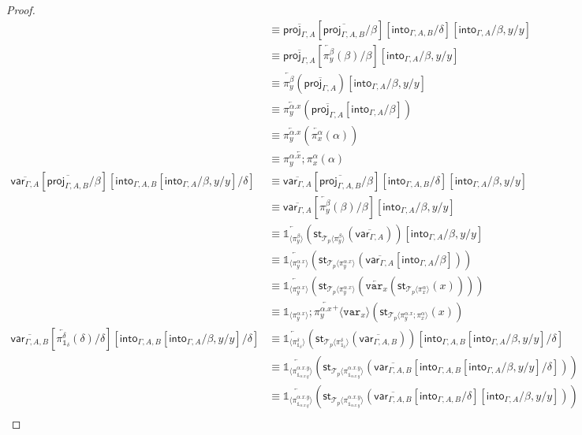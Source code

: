 \documentclass[10pt]{article}
\theoremstyle{definition}
\newcommand{\rewrite}[2]{\overleftarrow{#1}(#2)}
\newcommand\StI[2]{\ensuremath{\mathsf{st}_{#1}(#2)}}
\newcommand\ApEl[2]{\mathcal{T}_{#1}\langle#2\rangle}
\newcommand\ApPlus[2]{\ensuremath{{#1}^+ \langle #2 \rangle }}
\newcommand{\upstairs}[1]{\overline{#1}}
\newcommand\proj[1]{\ensuremath{\mathsf{proj}_{#1}}}
\newcommand\qvar[1]{\ensuremath{\mathsf{var}_{#1}}}
\newcommand\into[1]{\ensuremath{\mathsf{into}_{#1}}}
\newcommand\One{\ensuremath{\mathds{1}}}
\newcommand\var[1]{\ensuremath{\mathtt{var}_{#1}}}
\newcommand\ApOne[1]{\ensuremath{\One_{\langle {#1} \rangle }}}
\begin{document}
\begin{proof}
\begin{align*}
&\equiv \upstairs{\proj{\Gamma, A}}[\upstairs{\proj{\Gamma, A, B}}/\beta][\into{\Gamma, A, B}/\delta][\into{\Gamma, A}/\beta, y/y] \\
&\equiv \upstairs{\proj{\Gamma, A}}[\rewrite{\pi^\beta_y}{\beta}/\beta][\into{\Gamma, A}/\beta, y/y] \\
&\equiv \rewrite{\pi^\beta_y}{\upstairs{\proj{\Gamma, A}}}[\into{\Gamma, A}/\beta, y/y] \\
&\equiv \rewrite{\pi^{\alpha.x}_y}{\upstairs{\proj{\Gamma, A}}[\into{\Gamma, A}/\beta]} \\
&\equiv \rewrite{\pi^{\alpha.x}_y}{\rewrite{\pi^\alpha_x}{\alpha}} \\
&\equiv \rewrite{\pi^{\alpha.x}_y;\pi^\alpha_x}{\alpha} \\
\upstairs{\qvar{\Gamma, A}}[\upstairs{\proj{\Gamma, A, B}}/\beta][\into{\Gamma, A, B}[\into{\Gamma, A}/\beta, y/y]/\delta]
&\equiv \upstairs{\qvar{\Gamma, A}}[\upstairs{\proj{\Gamma, A, B}}/\beta][\into{\Gamma, A, B}/\delta][\into{\Gamma, A}/\beta, y/y] \\
&\equiv \upstairs{\qvar{\Gamma, A}}[\rewrite{\pi^\beta_y}{\beta}/\beta][\into{\Gamma, A}/\beta, y/y] \\
&\equiv \rewrite{\ApOne{\pi^\beta_y}}{\StI{\ApEl{p}{\pi^\beta_y}}{\upstairs{\qvar{\Gamma, A}}}}[\into{\Gamma, A}/\beta, y/y] \\
&\equiv \rewrite{\ApOne{\pi^{\alpha.x}_y}}{\StI{\ApEl{p}{\pi^{\alpha.x}_y}}{\upstairs{\qvar{\Gamma, A}}[\into{\Gamma, A}/\beta]}} \\
&\equiv \rewrite{\ApOne{\pi^{\alpha.x}_y}}{\StI{\ApEl{p}{\pi^{\alpha.x}_y}}{\rewrite{\var{x}}{\StI{\ApEl{p}{\pi^{\alpha}_x}}{x}}}} \\
&\equiv \rewrite{\ApOne{\pi^{\alpha.x}_y};\ApPlus{\pi^{\alpha.x}_y}{\var{x}}}{\StI{\ApEl{p}{\pi^{\alpha.x}_y;\pi^{\alpha}_x}}{x}} \\
\upstairs{\qvar{\Gamma, A, B}}[\rewrite{\pi^\delta_{\One_\delta}}{\delta}/\delta][\into{\Gamma, A, B}[\into{\Gamma, A}/\beta, y/y]/\delta]
&\equiv \rewrite{\ApOne{\pi^\delta_{\One_\delta}}}{\StI{\ApEl{p}{\pi^\delta_{\One_\delta}}}{\upstairs{\qvar{\Gamma, A, B}}}}[\into{\Gamma, A, B}[\into{\Gamma, A}/\beta, y/y]/\delta] \\
&\equiv \rewrite{\ApOne{\pi^{\alpha.x.y}_{\One_{\alpha.x.y}}}}{\StI{\ApEl{p}{\pi^{\alpha.x.y}_{\One_{\alpha.x.y}}}}{\upstairs{\qvar{\Gamma, A, B}}[\into{\Gamma, A, B}[\into{\Gamma, A}/\beta, y/y]/\delta]}} \\
&\equiv \rewrite{\ApOne{\pi^{\alpha.x.y}_{\One_{\alpha.x.y}}}}{\StI{\ApEl{p}{\pi^{\alpha.x.y}_{\One_{\alpha.x.y}}}}{\upstairs{\qvar{\Gamma, A, B}}[\into{\Gamma, A, B}/\delta][\into{\Gamma, A}/\beta, y/y]}} \\

\end{align*}
\end{proof}
\end{document}
